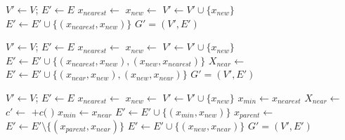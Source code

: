 \documentclass[paper=a4, fontsize=11pt]{scrartcl}
\begin{document}
\begin{algorithm}
\begin{algorithmic}[1]
\State $ V' \leftarrow V $; $ E' \leftarrow E $
\State $ x_{nearest} \leftarrow $ 
\State $ x_{new} \leftarrow $ 
\State $ V' \leftarrow V' \cup \{ x_{new} \} $
\State $ E' \leftarrow E' \cup \{ ( x_{nearest} , x_{new} ) \} $
\EndIf
\Return $ G' = (V', E') $ 
\end{algorithmic}
\label{alg:rrt_extend}
\caption{ $ \mbox{Extend}_{RRT} (G, x) $}
\end{algorithm}

\begin{algorithm}
\begin{algorithmic}[1]
\State $ V' \leftarrow V $; $ E' \leftarrow E $
\State $ x_{nearest} \leftarrow $ 
\State $ x_{new} \leftarrow $ 
\State $ V' \leftarrow V' \cup \{ x_{new} \} $
\State $ E' \leftarrow E' \cup \{ ( x_{nearest} , x_{new} ) , ( x_{new} , x_{nearest} ) \} $
\State $ X_{near} \leftarrow $ 
$ E' \leftarrow E' \cup \{ ( x_{near}, x_{new} ) , ( x_{new} , x_{near} ) \} $
\EndIf
\EndFor
\EndIf
\Return $ G' = (V', E') $ 
\end{algorithmic}
\label{alg:rrg_extend}
\caption{ $ \mbox{Extend}_{RRG} (G, x) $}
\end{algorithm}

\begin{algorithm}
\begin{algorithmic}[1]
\State $ V' \leftarrow V $; $ E' \leftarrow E $
\State $ x_{nearest} \leftarrow $ 
\State $ x_{new} \leftarrow $ 
\State $ V' \leftarrow V' \cup \{ x_{new} \} $
\State $ x_{min} \leftarrow x_{nearest} $
\State $ X_{near} \leftarrow $ 
\State $ c' \leftarrow $  $ + c( $  $ ) $ 
\State $ x_{min} \leftarrow x_{near} $
\EndIf
\EndIf
\EndFor
\State $ E' \leftarrow E' \cup \{ ( x_{min}, x_{new} ) \} $
\State $ x_{parent} \leftarrow $ 
\State $ E' \leftarrow E' \setminus \{ ( x_{parent}, x_{near} ) \} $
\State $ E' \leftarrow E' \cup \{ ( x_{new}, x_{near} ) \} $
\EndIf
\EndFor
\EndIf
\Return $ G' = (V', E') $ 
\end{algorithmic}
\label{alg:rrtstar_extend}
\caption{ $ \mbox{Extend}_{RRT^{*}} (G, x) $}
\end{algorithm}
\end{document}
